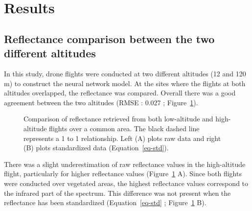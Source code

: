 \documentclass[
  number]{elsarticle}
\begin{document}
\section{Results}\label{results}

\subsection{Reflectance comparison between the two different
altitudes}\label{reflectance-comparison-between-the-two-different-altitudes}

In this study, drone flights were conducted at two different altitudes
(12 and 120 m) to construct the neural network model. At the sites where
the flights at both altitudes overlapped, the reflectance was compared.
Overall there was a good agreement between the two altitudes (RMSE :
0.027 ; Figure~\ref{fig-CompareRef}).

\label{cell-fig-CompareRef}
\begin{figure}[H]


\caption{\label{fig-CompareRef}Comparison of reflectance retrieved from
both low-altitude and high-altitude flights over a common area. The
black dashed line represents a 1 to 1 relationship. Left (A) plots raw
data and right (B) plots standardized data (Equation~\ref{eq-std}).}

\end{figure}%

There was a slight underestimation of raw reflectance values in the
high-altitude flight, particularly for higher reflectance values
(Figure~\ref{fig-CompareRef} A). Since both flights were conducted over
vegetated areas, the highest reflectance values correspond to the
infrared part of the spectrum. This difference was not present when the
reflectance has been standardized (Equation~\ref{eq-std} ;
Figure~\ref{fig-CompareRef} B).
\end{document}
